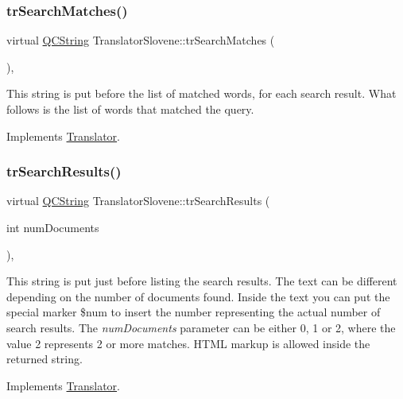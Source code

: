 \subsubsection{\texorpdfstring{trSearchMatches()}{trSearchMatches()}}
{\footnotesize\ttfamily virtual \mbox{\hyperlink{class_q_c_string}{Q\+C\+String}} Translator\+Slovene\+::tr\+Search\+Matches (\begin{DoxyParamCaption}{ }\end{DoxyParamCaption})\hspace{0.3cm}{\ttfamily [inline]}, {\ttfamily [virtual]}}

This string is put before the list of matched words, for each search result. What follows is the list of words that matched the query. 

Implements \mbox{\hyperlink{class_translator}{Translator}}.

\mbox{\label{class_translator_slovene_a337000022455759ea3cdbee809497f44}} 
\subsubsection{\texorpdfstring{trSearchResults()}{trSearchResults()}}
{\footnotesize\ttfamily virtual \mbox{\hyperlink{class_q_c_string}{Q\+C\+String}} Translator\+Slovene\+::tr\+Search\+Results (\begin{DoxyParamCaption}\item[{int}]{num\+Documents }\end{DoxyParamCaption})\hspace{0.3cm}{\ttfamily [inline]}, {\ttfamily [virtual]}}

This string is put just before listing the search results. The text can be different depending on the number of documents found. Inside the text you can put the special marker \$num to insert the number representing the actual number of search results. The {\itshape num\+Documents} parameter can be either 0, 1 or 2, where the value 2 represents 2 or more matches. H\+T\+ML markup is allowed inside the returned string. 

Implements \mbox{\hyperlink{class_translator}{Translator}}.

\mbox{\label{class_translator_slovene_ab83baf757fa3ee37089758b657191a2f}} 
